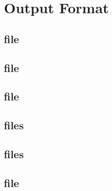 
\section{Output Format}
\label{section:output}
\setcounter{footnote}{0}

\subsection{ file}

\subsection{ file}

\subsection{ file}

\subsection{ files}


\subsection{ files}

\subsection{ file}











